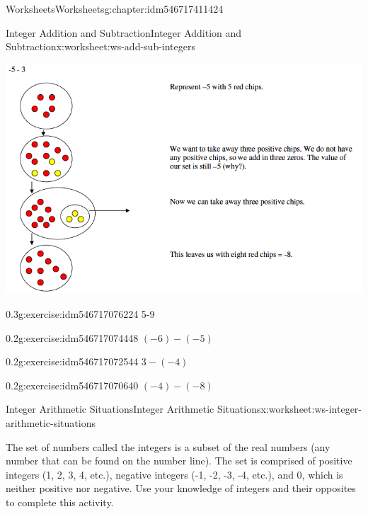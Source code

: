 \documentclass[twoside,11pt,]{book}
\begin{document}
\begin{chapterptx}{Worksheets}{}{Worksheets}{}{}{g:chapter:idm546717411424}
\begin{worksheet-section-numberless}{Integer Addition and Subtraction}{}{Integer Addition and Subtraction}{}{}{x:worksheet:ws-add-sub-integers}
\begin{introduction}{}
\begin{sidebyside}{1}{0}{0}{0}
\begin{sbspanel}{1}
\includegraphics[width=1\linewidth]{images/integer-sub-model.png}
\end{sbspanel}%
\end{sidebyside}%
%
\end{introduction}%
\begin{divisionexercise}{5}{}{0.3}{g:exercise:idm546717076224}%
5-9%
\end{divisionexercise}%
\clearpage
\begin{divisionexercise}{6}{}{0.2}{g:exercise:idm546717074448}%
\((-6)-(-5) \)%
\end{divisionexercise}%
\begin{divisionexercise}{7}{}{0.2}{g:exercise:idm546717072544}%
\(3-(-4) \)%
\end{divisionexercise}%
\begin{divisionexercise}{8}{}{0.2}{g:exercise:idm546717070640}%
\((-4)-(-8) \)%
\end{divisionexercise}%
\end{worksheet-section-numberless}
\restoregeometry
%
%
\typeout{************************************************}
\typeout{************************************************}
%
\begin{worksheet-section-numberless}{Integer Arithmetic Situations}{}{Integer Arithmetic Situations}{}{}{x:worksheet:ws-integer-arithmetic-situations}
\begin{introduction}{}%
The set of numbers called the integers is a subset of the real numbers (any number that can be found on the number line).  The set is comprised of positive integers (1, 2, 3, 4, etc.), negative integers (-1, -2, -3, -4, etc.), and 0, which is neither positive nor negative.  Use your knowledge of integers and their opposites to complete this activity.%

\end{introduction}
\end{worksheet-section-numberless}
\end{chapterptx}
\end{document}
